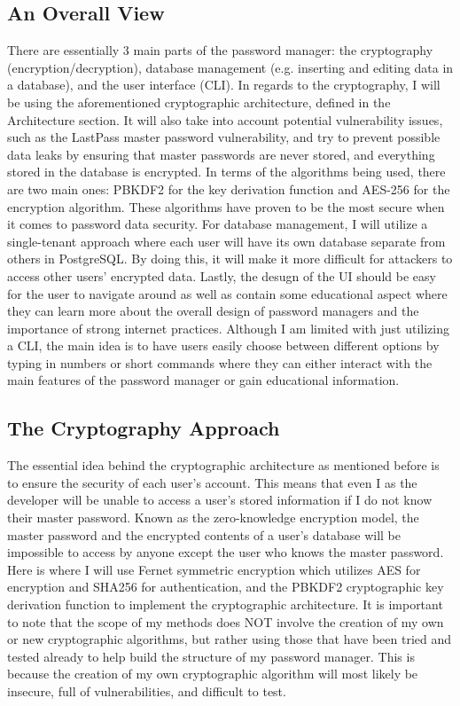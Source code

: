 \documentclass[10pt,twocolumn]{article}
\begin{document}
\subsection{An Overall View}
There are essentially 3 main parts of the password manager: the cryptography (encryption/decryption), database management (e.g. inserting and editing data in a database), and the user interface (CLI). In regards to the cryptography, I will be using the aforementioned cryptographic architecture, defined in the Architecture section. It will also take into account potential vulnerability issues, such as the LastPass master password vulnerability, and try to prevent possible data leaks by ensuring that master passwords are never stored, and everything stored in the database is encrypted. In terms of the algorithms being used, there are two main ones: PBKDF2 for the key derivation function and AES-256 for the encryption algorithm. These algorithms have proven to be the most secure when it comes to password data security. For database management, I will utilize a single-tenant approach where each user will have its own database separate from others\cite{Gillis_2023} in PostgreSQL. By doing this, it will make it more difficult for attackers to access other users' encrypted data. Lastly, the desugn of the UI should be easy for the user to navigate around as well as contain some educational aspect where they can learn more about the overall design of password managers and the importance of strong internet practices. Although I am limited with just utilizing a CLI, the main idea is to have users easily choose between different options by typing in numbers or short commands where they can either interact with the main features of the password manager or gain educational information.

\subsection{The Cryptography Approach}
The essential idea behind the cryptographic architecture as mentioned before is to ensure the security of each user's account. This means that even I as the developer will be unable to access a user's stored information if I do not know their master password. Known as the zero-knowledge encryption model\cite{Fremery_2023}, the master password and the encrypted contents of a user's database will be impossible to access by anyone except the user who knows the master password. Here is where I will use Fernet symmetric encryption which utilizes AES for encryption and SHA256 for authentication, and the PBKDF2 cryptographic key derivation function to implement the cryptographic architecture. It is important to note that the scope of my methods does NOT involve the creation of my own or new cryptographic algorithms, but rather using those that have been tried and tested already to help build the structure of my password manager. This is because the creation of my own cryptographic algorithm will most likely be insecure, full of vulnerabilities, and difficult to test.
\end{document}

